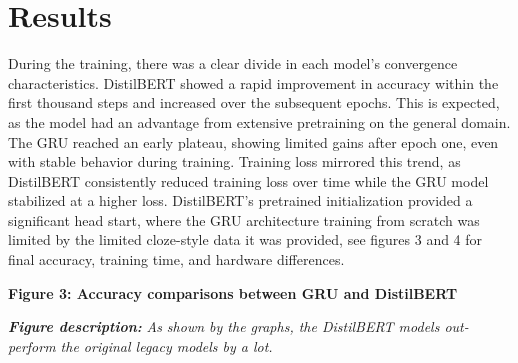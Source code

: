 \documentclass[11pt]{article}
\begin{document}
    \section{Results}\label{results}

    During the training, there was a clear divide in each model's
convergence characteristics. DistilBERT showed a rapid improvement in
accuracy within the first thousand steps and increased over the
subsequent epochs. This is expected, as the model had an advantage from
extensive pretraining on the general domain. The GRU reached an early
plateau, showing limited gains after epoch one, even with stable
behavior during training. Training loss mirrored this trend, as
DistilBERT consistently reduced training loss over time while the GRU
model stabilized at a higher loss. DistilBERT's pretrained
initialization provided a significant head start, where the GRU
architecture training from scratch was limited by the limited
cloze-style data it was provided, see figures 3 and 4 for final
accuracy, training time, and hardware differences.

    \begin{samepage}
    \begin{center}
		\textbf{Figure 3: Accuracy comparisons between GRU and DistilBERT}
    \end{center}
    \vspace{1em}
\noindent\begin{minipage}{0.9\linewidth}
\begin{scriptsize}
\textbf{\textit{Figure description:}} \textit{As shown by the graphs, the DistilBERT models out-perform the original legacy models by a lot.}
\end{scriptsize}
\end{minipage}
    \end{samepage}
    { \hspace*{\fill} \\}
\end{document}
